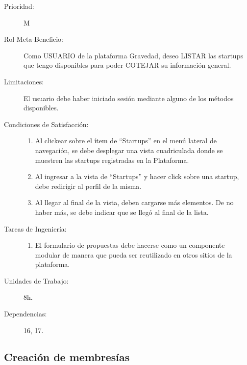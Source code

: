 \begin{description}
    \item[Prioridad:] M
    \item[Rol-Meta-Beneficio:]  Como USUARIO de la plataforma Gravedad, deseo LISTAR las startups que tengo disponibles para poder COTEJAR su información general.
    \item[Limitaciones:] El usuario debe haber iniciado sesión mediante alguno de los métodos disponibles.
    \item[Condiciones de Satisfacción:]  \hfill
        \begin{enumerate}
            \item Al clickear sobre el ítem de “Startups” en el menú lateral de navegación, se debe desplegar una vista cuadriculada donde se muestren las startups registradas en la Plataforma.
    		\item Al ingresar a la vista de “Startups” y hacer click sobre una startup, debe redirigir al perfil de la misma.
    		\item Al llegar al final de la vista, deben cargarse más elementos. De no haber más, se debe indicar que se llegó al final de la lista.
        \end{enumerate}
    \item[Tareas de Ingeniería:]  \hfill
        \begin{enumerate}
            \item El formulario de propuestas debe hacerse como un componente modular de manera que pueda ser reutilizado en otros sitios de la plataforma.
        \end{enumerate}
    \item[Unidades de Trabajo:] 8h.
    \item[Dependencias:] 16, 17.
\end{description}

\newpage


\subsection{Creación de membresías}

